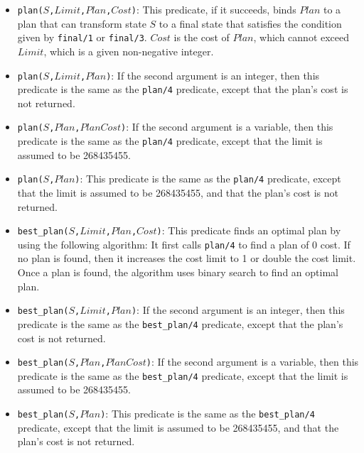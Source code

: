\begin{itemize}
\item \texttt{plan($S$,$Limit$,$Plan$,$Cost$)}: This predicate, if it succeeds, binds $Plan$ to a plan that can transform state $S$ to a final state that satisfies the condition given by {\tt final/1} or {\tt final/3}. $Cost$ is the cost of $Plan$, which cannot exceed $Limit$, which is a given non-negative integer. 

\item \texttt{plan($S$,$Limit$,$Plan$)}: If the second argument is an integer, then this predicate is the same as the \texttt{plan/4} predicate, except that the plan's cost is not returned. 

\item \texttt{plan($S$,$Plan$,$PlanCost$)}: If the second argument is a variable, then this predicate is the same as the \texttt{plan/4} predicate, except that the limit is assumed to be 268435455.

\item \texttt{plan($S$,$Plan$)}: This predicate is the same as the \texttt{plan/4} predicate, except that the limit is assumed to be 268435455, and that the plan's cost is not returned.

\item \texttt{best\_plan($S$,$Limit$,$Plan$,$Cost$)}: This predicate finds an optimal plan by using the following algorithm:  It first calls {\tt plan/4} to find a plan of 0 cost. If no plan is found, then it increases the cost limit to 1 or double the cost limit. Once a plan is found, the algorithm uses binary search to find an optimal plan.

\item \texttt{best\_plan($S$,$Limit$,$Plan$)}: If the second argument is an integer, then this predicate is the same as the \texttt{best\_plan/4} predicate, except that the plan's cost is not returned. 

\item \texttt{best\_plan($S$,$Plan$,$PlanCost$)}: If the second argument is a variable, then this predicate is the same as the \texttt{best\_plan/4} predicate, except that the limit is assumed to be 268435455.

\item \texttt{best\_plan($S$,$Plan$)}: This predicate is the same as the \texttt{best\_plan/4} predicate, except that the limit is assumed to be 268435455, and that the plan's cost is not returned.


\end{itemize}
